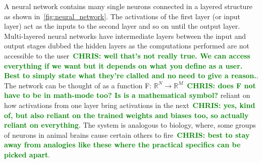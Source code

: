 \documentclass[12pt]{iopart}
\newcommand{\chris}[1]{\textbf{\textcolor{green}{CHRIS: #1}}}
\begin{document}
%
A neural network contains many single neurons connected in a layered structure
as shown in~\cref{fig:neural_network}. The activations of the first layer (or
input layer) act as the inputs to the second layer and so on until the output
layer. Multi-layered neural networks have intermediate layers between the input
and output stages dubbed the hidden layers as the computations performed are
not accessible to the user~\chris{well that's not really true. We can access
everything if we want but it depends on what you define as a user. Best to
simply state what they're clalled and no need to give a reason.}. The network
can be thought of as a function F: $\mathbb{R}^N\rightarrow
\mathbb{R}^M$~\chris{does F not have to be in math-mode too? Is is a
mathematical symbol?} reliant on how activations from one layer bring
activations in the next~\chris{yes, kind of, but also reliant on the trained
weights and biases too, so actually reliant on everything}. The system is
analogous to biology, where, some groups of neurons in animal brains cause
certain others to fire~\chris{best to stay away from analogies like these where
the practical specifics can be picked apart}. 

\end{document}
